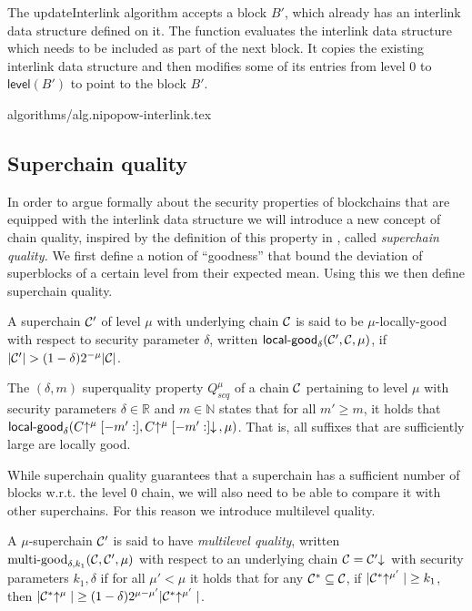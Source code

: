The updateInterlink algorithm accepts a block $B'$, which already has an
interlink data structure defined on it. The function evaluates the
interlink data structure which needs to be included as part of the next block.
It copies the existing interlink data structure and
then modifies some of its entries from level $0$ to $\textsf{level}(B')$ to
point to the block $B'$.

{algorithms/alg.nipopow-interlink.tex}

\subsection{Superchain quality}
In order to argue formally about the security
properties of blockchains that are equipped with the interlink
data structure we will introduce a new concept of chain quality,
inspired by the definition of this property in \cite{backbone},
called {\em superchain quality.}
We first define a notion of ``goodness'' that bound the deviation
of superblocks of a certain level from their expected mean. Using
this we then define superchain quality.

\begin{definition}
A superchain $\mathcal{C}'$ of level
$\mu$ with underlying chain $\mathcal{C}$ is said to be $\mu$-\textnormal{locally-good}
with respect to security parameter $\delta$, written
$\textsf{local-good}_{\delta}(\mathcal{C}', \mathcal{C}, \mu)$, if $|\mathcal{C}'| > (1 -
\delta)2^{-\mu}|\mathcal{C}|$.
\end{definition}

\begin{definition}
The $(\delta, m)$ superquality property
$Q^\mu_{scq}$ of a chain $\mathcal{C}$ pertaining to level $\mu$ with security
parameters $\delta \in \mathbb{R}$ and $m \in \mathbb{N}$ states that for all
$m' \geq m$, it holds that $\textsf{local-good}_{\delta}(C\negthickspace\uparrow^\mu[-m':],
C\negthickspace\uparrow^\mu[-m':]\negthickspace\downarrow\,, \mu)$. That is, all suffixes that are
sufficiently large are locally good.
\end{definition}

While superchain quality guarantees that a superchain has a sufficient number
of blocks w.r.t. the level 0 chain, we will also need to be able to compare
it with other superchains. For this reason we introduce multilevel quality.

\begin{definition}
A $\mu$-superchain $\mathcal{C}'$ is said to have \textit{multilevel quality}, written
$\textnormal{multi-good}_{\delta, k_1}(\mathcal{C}, \mathcal{C}', \mu)$ with respect to an
underlying chain $\mathcal{C} = \mathcal{C}'\negthickspace\downarrow\,$ with security parameters $k_1,
\delta$ if for all $\mu' < \mu$ it holds that for any $\mathcal{C}^* \subseteq \mathcal{C}$,
if $|\mathcal{C}^*\negthickspace\uparrow^{\mu'}| \geq k_1$, then $|\mathcal{C}^*\negthickspace\uparrow^{\mu}| \geq (1 -
\delta)2^{\mu - \mu'}|\mathcal{C}^*\negthickspace\uparrow^{\mu'}|$.
\end{definition}

